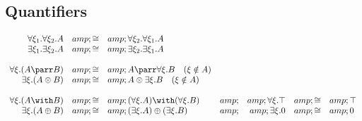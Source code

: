 \subsection{Quantifiers}\label{quantifiers-1}

\(\begin{array}{rclcrcl}
  \forall \xi_1. \forall\xi_2. A &amp;\cong&amp; \forall\xi_2. \forall\xi_1. A\\
  \exists \xi_1. \exists\xi_2.A &amp;\cong&amp; \exists\xi_2.\exists\xi_1.A\\
\\
  \forall \xi . (A \parr B) &amp;\cong&amp; A \parr \forall \xi.B \quad (\xi\notin A) \\
  \exists \xi . (A \tens B) &amp;\cong&amp; A \tens \exists \xi.B \quad (\xi\notin A) \\
\\
  \forall \xi . (A \with B) &amp;\cong&amp; (\forall \xi . A) \with (\forall \xi . B) &amp; &amp; \forall \xi . \top &amp;\cong&amp; \top \\
  \exists \xi . (A \plus B) &amp;\cong&amp; (\exists \xi . A) \plus (\exists \xi . B) &amp; &amp; \exists \xi . \zero &amp;\cong&amp; \zero
\end{array}\)

